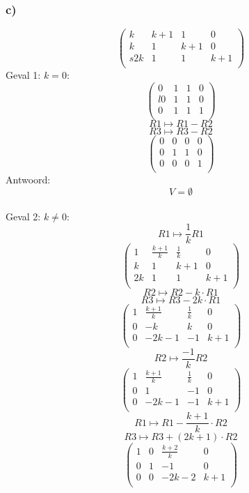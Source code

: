 \documentclass[10pt,a4paper]{article}
\begin{document}
\subsubsection*{c)}
\[
\begin{pmatrix}
k & k+1 & 1 & 0\\
k & 1 & k+1 & 0\\s
2k & 1 & 1 & k+1\\
\end{pmatrix}
\]
Geval 1: $k=0$:
\[
\begin{pmatrix}
0 & 1 & 1 & 0\\l
0 & 1 & 1 & 0\\
0 & 1 & 1 & 1\\
\end{pmatrix}
\]
\[ R1 \longmapsto R1 - R2 \]
\[ R3 \longmapsto R3 - R2 \]
\[
\begin{pmatrix}
0 & 0 & 0 & 0\\
0 & 1 & 1 & 0\\
0 & 0 & 0 & 1\\
\end{pmatrix}
\]
Antwoord:
\[
V=\emptyset
\]\\
Geval 2: $k\neq0$:
\[ R1 \longmapsto \frac{1}{k}R1 \]
\[
\begin{pmatrix}
1 & \frac{k+1}{k} & \frac{1}{k} & 0\\
k & 1 & k+1 & 0\\
2k & 1 & 1 & k+1\\
\end{pmatrix}
\]
\[ R2 \longmapsto R2 - k\cdot R1 \]
\[ R3 \longmapsto R3 - 2k\cdot R1 \]
\[
\begin{pmatrix}
1 & \frac{k+1}{k} & \frac{1}{k} & 0\\
0 & -k & k & 0\\
0 & -2k-1 & -1 & k+1\\
\end{pmatrix}
\]
\[ R2 \longmapsto \frac{-1}{k}R2\]
\[
\begin{pmatrix}
1 & \frac{k+1}{k} & \frac{1}{k} & 0\\
0 & 1 & -1 & 0\\
0 & -2k-1 & -1 & k+1\\
\end{pmatrix}
\]
\[ R1 \longmapsto R1 - \frac{k+1}{k}\cdot R2 \]
\[ R3 \longmapsto R3 + (2k+1)\cdot R2 \]
\[
\begin{pmatrix}
1 & 0 & \frac{k+2}{k} & 0\\
0 & 1 & -1 & 0\\
0 & 0 & -2k-2 & k+1\\
\end{pmatrix}
\]
\end{document}
